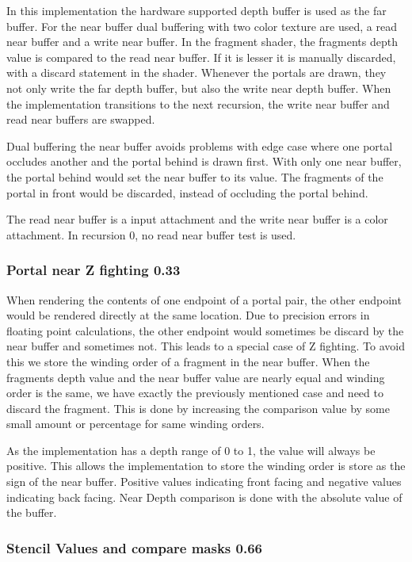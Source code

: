 In this implementation the hardware supported depth buffer is used as the far buffer. For the near buffer dual buffering with two color texture are used, a read near buffer and a write near buffer. In the fragment shader, the fragments depth value is compared to the read near buffer. If it is lesser it is manually discarded, with a discard statement in the shader. Whenever the portals are drawn, they not only write the far depth buffer, but also the write near depth buffer. When the implementation transitions to the next recursion, the write near buffer and read near buffers are swapped.

Dual buffering \cite{lowe:2005:technique} the near buffer avoids problems with edge case where one portal occludes another and the portal behind is drawn first. With only one near buffer, the portal behind would set the near buffer to its value. The fragments of the portal in front would be discarded, instead of occluding the portal behind.

The read near buffer is a input attachment and the write near buffer is a color attachment. In recursion 0, no read near buffer test is used.

\subsubsection{Portal near Z fighting 0.33}
\label{section:portalzfighting}
When rendering the contents of one endpoint of a portal pair, the other endpoint would be rendered directly at the same location. Due to precision errors in floating point calculations, the other endpoint would sometimes be discard by the near buffer and sometimes not. This leads to a special case of Z fighting. To avoid this we store the winding order of a fragment in the near buffer. When the fragments depth value and the near buffer value are nearly equal and winding order is the same, we have exactly the previously mentioned case and need to discard the fragment. This is done by increasing the comparison value by some small amount or percentage for same winding orders.

As the implementation has a depth range of 0 to 1, the value will always be positive. This allows the implementation to store the winding order is store as the sign of the near buffer. Positive values indicating front facing and negative values indicating back facing. Near Depth comparison is done with the absolute value of the buffer.

\subsubsection{Stencil Values and compare masks 0.66}
\label{section:stencilcomparemasks}

